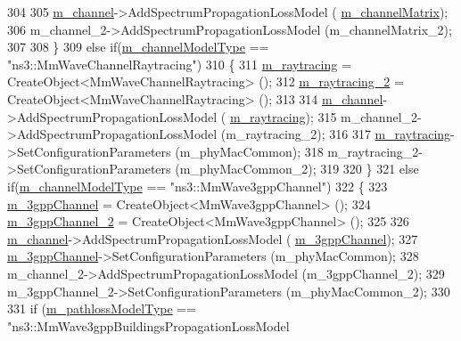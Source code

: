 \begin{DoxyCode}
304 
305                 \hyperlink{classns3_1_1MmWaveHelper_adac6d83bc2acef8b7dbd9fc668207d95}{m\_channel}->AddSpectrumPropagationLossModel (
      \hyperlink{classns3_1_1MmWaveHelper_a731a9e28a12edacd78b96800025db070}{m\_channelMatrix});
306                 m\_channel\_2->AddSpectrumPropagationLossModel (m\_channelMatrix\_2);
307 
308         \}
309         \textcolor{keywordflow}{else} \textcolor{keywordflow}{if}(\hyperlink{classns3_1_1MmWaveHelper_aec88d691230f0db9448a7f953301bb24}{m\_channelModelType} == \textcolor{stringliteral}{"ns3::MmWaveChannelRaytracing"})
310         \{
311                 \hyperlink{classns3_1_1MmWaveHelper_a99e1ebbb84d122ea60a9fe7c1bb44528}{m\_raytracing} = CreateObject<MmWaveChannelRaytracing> ();
312                 \hyperlink{classns3_1_1MmWaveHelper_a4fcc697a0b40deaa9bd75ead1c4297d9}{m\_raytracing\_2} = CreateObject<MmWaveChannelRaytracing> ();
313 
314                 \hyperlink{classns3_1_1MmWaveHelper_adac6d83bc2acef8b7dbd9fc668207d95}{m\_channel}->AddSpectrumPropagationLossModel (
      \hyperlink{classns3_1_1MmWaveHelper_a99e1ebbb84d122ea60a9fe7c1bb44528}{m\_raytracing});
315                 m\_channel\_2->AddSpectrumPropagationLossModel (m\_raytracing\_2);
316 
317                 \hyperlink{classns3_1_1MmWaveHelper_a99e1ebbb84d122ea60a9fe7c1bb44528}{m\_raytracing}->SetConfigurationParameters (m\_phyMacCommon);
318                 m\_raytracing\_2->SetConfigurationParameters (m\_phyMacCommon\_2);
319 
320         \}
321         \textcolor{keywordflow}{else} \textcolor{keywordflow}{if}(\hyperlink{classns3_1_1MmWaveHelper_aec88d691230f0db9448a7f953301bb24}{m\_channelModelType} == \textcolor{stringliteral}{"ns3::MmWave3gppChannel"})
322         \{
323                 \hyperlink{classns3_1_1MmWaveHelper_a1cbb083568aa048da48260725e3cf4a4}{m\_3gppChannel} = CreateObject<MmWave3gppChannel> ();
324                 \hyperlink{classns3_1_1MmWaveHelper_a708ff94e1399ab339e634dc7d4a5b44d}{m\_3gppChannel\_2} = CreateObject<MmWave3gppChannel> ();
325 
326                 \hyperlink{classns3_1_1MmWaveHelper_adac6d83bc2acef8b7dbd9fc668207d95}{m\_channel}->AddSpectrumPropagationLossModel (
      \hyperlink{classns3_1_1MmWaveHelper_a1cbb083568aa048da48260725e3cf4a4}{m\_3gppChannel});
327                 \hyperlink{classns3_1_1MmWaveHelper_a1cbb083568aa048da48260725e3cf4a4}{m\_3gppChannel}->SetConfigurationParameters (m\_phyMacCommon);
328                 m\_channel\_2->AddSpectrumPropagationLossModel (m\_3gppChannel\_2);
329                 m\_3gppChannel\_2->SetConfigurationParameters (m\_phyMacCommon\_2);
330 
331                 \textcolor{keywordflow}{if} (\hyperlink{classns3_1_1MmWaveHelper_a7f17e9bc4797b51d9a31d16c7e667960}{m\_pathlossModelType} == \textcolor{stringliteral}{"ns3::MmWave3gppBuildingsPropagationLossModel
}
\end{DoxyCode}
